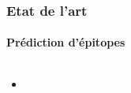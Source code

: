 \documentclass[11pt, notes]{beamer}
\begin{document}
\begin{frame}
\frametitle{Etat de l'art}
\framesubtitle{Prédiction d'épitopes}
\begin{columns}[c]
	\begin{column}[c]{5cm}
		\begin{itemize}[<+->]
			\item 
		\end{itemize}
	\end{column}
	\begin{column}[c]{5cm}
	\end{column}
\end{columns}
\end{frame}
\end{document}

